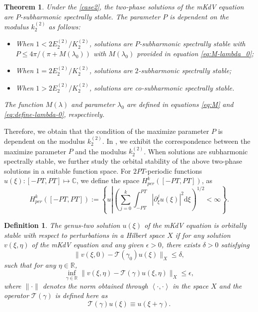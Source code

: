 \documentclass[11pt,reqno]{amsart}
\newcommand{\dd}{\mathrm{d}}
\newtheorem{theorem}{Theorem}
\newtheorem{define}{Definition}
\numberwithin{equation}{section}
\begin{document}
\begin{theorem}\label{theorem:spectral-complex-P}
	Under the \ref{case2}, the two-phase solutions of the mKdV equation are $P$-subharmonic spectrally stable. 
	The parameter $P$ is dependent on the modulus $k_2^{(2)}$ as follows:
	\begin{itemize}
		\item When $1<2 E^{(2)}_2/  K^{(2)}_2$, solutions are $P$-subharmonic spectrally stable with $P\le 4\pi/(\pi+M(\lambda_0))$ with $M(\lambda_0)$ provided in equation \eqref{eq:M-lambda_0};
		\item When $1=2 E^{(2)}_2/  K^{(2)}_2$, solutions are $2$-subharmonic spectrally stable;
		\item When $1>2 E^{(2)}_2/  K^{(2)}_2$, solutions are co-subharmonic spectrally stable.
	\end{itemize}
	The function $M(\lambda)$ and parameter $\lambda_0$ are defined in equations \eqref{eq:M} and \eqref{eq:define-lambda-0}, respectively.
\end{theorem}

Therefore, we obtain that the condition of the maximize parameter $P$ is dependent on the modulus $k_2^{(2)}$. 
In , we exhibit the correspondence between the maximize parameter $P$ and the modulus $k_2^{(2)}$.
When solutions are subharmonic spectrally stable, we further study the orbital stability of the above two-phase solutions in a suitable function space.
For $2PT$-periodic functions $u(\xi):[-PT,PT]\mapsto \mathbb{C}$, we define the space $H^{k}_{per}([-PT,PT])$, as
\begin{equation}\nonumber
	H^{k}_{per}([-PT,PT]):=\left\{u\left|\left(\sum_{j=0}^{k}\int_{-PT}^{PT}\left|\partial_{\xi}^ju(\xi)\right|^2\dd \xi\right)^{1/2}< \infty\right.\right\}.
\end{equation}

\begin{define}\label{define:orbital stable}
	The genus-two solution $u(\xi)$ of the mKdV equation is orbitally stable with respect to perturbations in a Hilbert space $X$ if for any solution $v(\xi,\eta)$ of the mKdV equation and any given $\epsilon>0$, there exists $\delta>0$ satisfying
	\begin{equation} \nonumber
		\| v(\xi,0)- \mathcal{T}(\gamma_0)u(\xi) \|_{X}\le \delta,
	\end{equation}
	such that for any $ \eta \in \mathbb{R} $,
	\begin{equation} \nonumber
		\inf_{\gamma\in \mathbb{R}} \| v(\xi,\eta)-\mathcal{T}(\gamma)u(\xi,\eta ) \|_{X} \le \epsilon, 
	\end{equation} 
	where $\|\cdot \|$ denotes the norm obtained through $\left\langle\cdot, \cdot\right\rangle $ in the space $X$ and the operator $\mathcal{T}(\gamma)$ is defined here as
	\begin{equation}\label{eq:defin-operator}
		\mathcal{T}(\gamma)u(\xi)\equiv u(\xi+\gamma).
	\end{equation}
\end{define}
\end{document}
